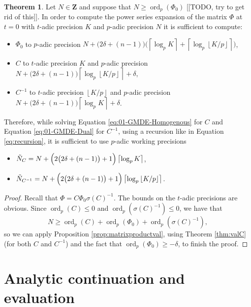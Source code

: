 \documentclass[a4paper,11pt]{article}
\numberwithin{equation}{section}
\providecommand{\floor}[1]{\left\lfloor#1\right\rfloor}   %
\providecommand{\ceil}[1]{\left\lceil#1\right\rceil}   %
\newcommand{\ZZ}{\mathbf{Z}} %
\newcommand{\QQ}{\mathbf{Q}} %
\DeclareMathOperator{\ord}{ord}          %
\theoremstyle{definition}
\newtheorem{thm}{Theorem}[section]
\begin{document}
\begin{thm}
Let $N \in \ZZ$ and suppose that $N \geq \ord_p(\Phi_0)$ [[TODO, try to get rid of this]]. In order to compute the power series expansion 
of the matrix $\Phi$ at $t=0$ with $t$-adic precision $K$ and $p$-adic precision $N$ 
it is sufficient to compute:
\begin{itemize}
\item $\Phi_0$ to $p$-adic precision $N+\bigl(2\delta+(n-1)\bigr) \bigl(\ceil{\log_p K} + \ceil{\log_p \floor{K/p}}\bigr)$,
\item $C$ to $t$-adic precision $K$ and $p$-adic precision $N+\bigl(2\delta+(n-1)\bigr) \ceil{\log_p \floor{K/p}} + \delta$,
\item $C^{-1}$ to $t$-adic precision $\floor{K/p}$ and $p$-adic precision $N+\bigl(2\delta+(n-1)\bigr) \ceil{\log_p K} + \delta$.
\end{itemize}
Therefore, while solving Equation \eqref{eq:01-GMDE-Homogenous} for $C$ and Equation \eqref{eq:01-GMDE-Dual} for $C^{-1}$, using 
a recursion like in Equation \eqref{eq:recursion}, it is sufficient to use $p$-adic working precisions
\begin{itemize}
\item $\tilde{N}_C=N+\Bigl(2 \bigl(2 \delta + (n-1)\bigr) + 1\Bigr) \ceil{\log_p K}$, 
\item $\tilde{N}_{C^{-1}}=N+\Bigl(2 \bigl(2 \delta + (n-1)\bigr) + 1\Bigr) \ceil{\log_p \floor{K/p}}$.
\end{itemize}
\end{thm}

\begin{proof}
Recall that $\Phi = C \Phi_0 \sigma(C)^{-1}$. The bounds on the $t$-adic precisions are obvious. 
Since $\ord_p(C) \leq 0$ and $\ord_p(\sigma(C)^{-1}) \leq 0$, we have that 
\[
N \geq \ord_p(C) + \ord_p(\Phi_0) + \ord_p(\sigma(C)^{-1}),
\]
so we can apply Proposition \ref{prop:matrixproductval}, using Theorem \ref{thm:valC} (for both $C$ and $C^{-1}$) 
and the fact that $\ord_p(\Phi_0) \geq -\delta$, to finish the proof.
\end{proof}


\section{Analytic continuation and evaluation}
\label{sec:Evaluation}
\end{document}
